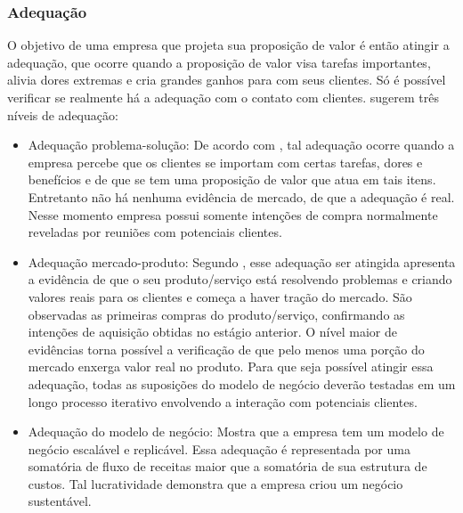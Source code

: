 \subsubsection{Adequação}
\label{cha:adequação}
O objetivo de uma empresa que projeta sua proposição de valor é então atingir a adequação, que ocorre quando a proposição de valor visa tarefas importantes, alivia dores extremas e cria grandes ganhos para com seus clientes. Só é possível verificar se realmente há a adequação com o contato com clientes.  sugerem três níveis de adequação:
\begin{itemize}
\item Adequação problema-solução: De acordo com , tal adequação ocorre quando a empresa percebe que os clientes se importam com certas tarefas, dores e benefícios e de que se tem uma proposição de valor que atua em tais itens. Entretanto não há nenhuma evidência de mercado, de que a adequação é real. Nesse momento empresa possui somente intenções de compra normalmente reveladas por reuniões com potenciais clientes.
\item Adequação mercado-produto: Segundo , esse adequação ser atingida apresenta a evidência de que o seu produto/serviço está resolvendo problemas e criando valores reais para os clientes e começa a haver tração do mercado. São observadas as primeiras compras do produto/serviço, confirmando as intenções de aquisição obtidas no estágio anterior. O nível maior de evidências torna possível a verificação de que pelo menos uma porção do mercado enxerga valor real no produto. Para que seja possível atingir essa adequação, todas as suposições do modelo de negócio deverão testadas em um longo processo iterativo envolvendo a interação com potenciais clientes.
\item Adequação do modelo de negócio: Mostra que a empresa tem um modelo de negócio escalável e replicável. Essa adequação é representada por uma somatória de fluxo de receitas maior que a somatória de sua estrutura de custos. Tal lucratividade demonstra que a empresa criou um negócio sustentável. \cite{valueproposition}
\end{itemize}